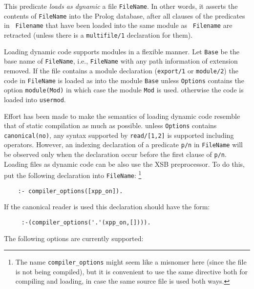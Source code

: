 \begin{description}
  \label{load_dyn_gen/2}
%
   This predicate {\em loads as dynamic} a file {\tt FileName}.  In
   other words, it asserts the contents of {\tt FileName} into the
   Prolog database, after all clauses of the predicates in {\tt
     Filename} that have been loaded into the same module as {\tt
     Filename} are retracted (unless there is a {\tt multifile/1}
   declaration for them).

   Loading dynamic code supports modules in a flexible manner.  Let
   {\tt Base} be the base name of {\tt FileName}, i.e., {\tt FileName}
   with any path information of extension removed.  If the file
   contains a module declaration ({\tt export/1} or {\tt module/2})
   the code in {\tt FileName} is loaded as into the module {\tt Base}
   unless {\tt Options} contains the option {\tt module(Mod)} in which
   case the module {\tt Mod} is used.  otherwise the code is loaded
   into {\tt usermod}.

   Effort has been made to make the semantics of loading dynamic code
   resemble that of static compilation as much as possible.  unless
   {\tt Options} contains {\tt canonical(no)}, any syntax supported by
   {\tt read/[1,2]} is supported including operators.  However, an
   indexing declaration of a predicate {\tt p/n} in {\tt FileName}
   will be observed only when the declaration occur before the first
   clause of {\tt p/n}.  Loading files as dynamic code can be also use
   the XSB preprocessor.  To do this, put the following declaration
   into {\tt FileName}:
    \footnote{The name {\tt compiler\_options} might seem like a misnomer
    here (since the file is not being compiled), but it is convenient to
    use the same directive both for compiling and loading, in case the same
    source file is used both ways.}
    \begin{verbatim}
    :- compiler_options([xpp_on]).      
\end{verbatim}

    If the canonical reader is used this declaration should have the form: 
    \begin{verbatim}
     :-(compiler_options('.'(xpp_on,[]))).      
    \end{verbatim}

    The following options are currently supported:


\end{description}
